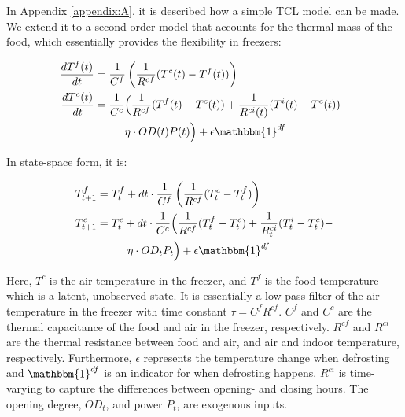 \documentclass[11pt,a4paper]{article}
\begin{document}
In Appendix \ref{appendix:A}, it is described how a simple TCL model can be made. We extend it to a second-order model that accounts for the thermal mass of the food, which essentially provides the flexibility in freezers:

\begin{subequations}\label{eq:2ndFreezer}
    \begin{align}
        \frac{dT^f(t)}{dt} & = \frac{1}{C^f}\left(\frac{1}{R^{cf}} (T^c(t) - T^f(t)) \right)                                                                                  \\
        \frac{dT^c(t)}{dt} & = \frac{1}{C^c}\Bigl(\frac{1}{R^{cf}} (T^f(t) - T^c(t)) + \frac{1}{R^{ci}(t)} (T^i(t) - T^c(t))                                         - \notag \\ & \mspace{50mu} \eta \cdot OD(t) P(t) \Bigr) + \epsilon \mathbbm{1}^{df}
    \end{align}
\end{subequations}

In state-space form, it is:

\begin{subequations}\label{eq:2ndFreezerStateSpace}
    \begin{align}
        T^{f}_{t+1} & = T^{f}_{t} + dt \cdot \frac{1}{C^f}\left(\frac{1}{R^{cf}} (T^{c}_{t} - T^{f}_{t}) \right)                                                                               \\
        T^{c}_{t+1} & = T^{c}_t + dt \cdot \frac{1}{C^c}\Bigl(\frac{1}{R^{cf}} (T^{f}_t - T^{c}_t) + \frac{1}{R^{ci}_{t}} (T^{i}_t - T^{c}_t)                                         - \notag \\ & \mspace{50mu} \eta \cdot OD_t P_t \Bigr) + \epsilon \mathbbm{1}^{df}
    \end{align}
\end{subequations}


Here, $T^c$ is the air temperature in the freezer, and $T^f$ is the food temperature which is a latent, unobserved state. It is essentially a low-pass filter of the air temperature in the freezer with time constant $\tau = C^f R^{cf}$. $C^f$ and $C^c$ are the thermal capacitance of the food and air in the freezer, respectively. $R^{cf}$ and $R^{ci}$ are the thermal resistance between food and air, and air and indoor temperature, respectively. Furthermore, $\epsilon$ represents the temperature change when defrosting and $\mathbbm{1}^{df}$ is an indicator for when defrosting happens. $R^{ci}$ is time-varying to capture the differences between opening- and closing hours. The opening degree, $OD_t$, and power $P_t$, are exogenous inputs.
\end{document}
